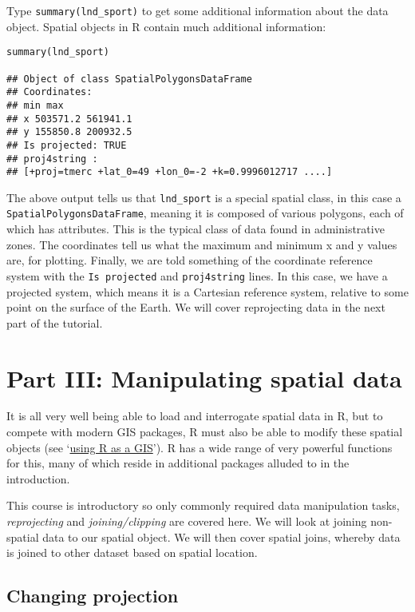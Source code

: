 \documentclass[]{article}
\begin{document}
Type \texttt{summary(lnd\_sport)} to get some additional information
about the data object. Spatial objects in R contain much additional
information:

\begin{verbatim}
summary(lnd_sport)

## Object of class SpatialPolygonsDataFrame
## Coordinates:
## min max
## x 503571.2 561941.1
## y 155850.8 200932.5
## Is projected: TRUE
## proj4string :
## [+proj=tmerc +lat_0=49 +lon_0=-2 +k=0.9996012717 ....]
\end{verbatim}

The above output tells us that \texttt{lnd\_sport} is a special spatial
class, in this case a \texttt{SpatialPolygonsDataFrame}, meaning it is
composed of various polygons, each of which has attributes. This is the
typical class of data found in administrative zones. The coordinates
tell us what the maximum and minimum x and y values are, for plotting.
Finally, we are told something of the coordinate reference system with
the \texttt{Is projected} and \texttt{proj4string} lines. In this case,
we have a projected system, which means it is a Cartesian reference
system, relative to some point on the surface of the Earth. We will
cover reprojecting data in the next part of the tutorial.

\clearpage

\section{Part III: Manipulating spatial
data}\label{part-iii-manipulating-spatial-data}

It is all very well being able to load and interrogate spatial data in
R, but to compete with modern GIS packages, R must also be able to
modify these spatial objects (see
`\href{https://github.com/Pakillo/R-GIS-tutorial}{using R as a GIS}'). R
has a wide range of very powerful functions for this, many of which
reside in additional packages alluded to in the introduction.

This course is introductory so only commonly required data manipulation
tasks, \emph{reprojecting} and \emph{joining/clipping} are covered here.
We will look at joining non-spatial data to our spatial object. We will
then cover spatial joins, whereby data is joined to other dataset based
on spatial location.

\subsection{Changing projection}\label{changing-projection}
\end{document}
